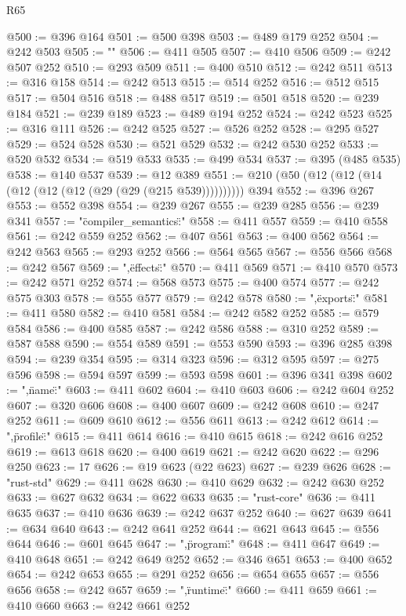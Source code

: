 \begin{lexlean}{R65}
\begin{coremodule}
@500 := @396 @164
@501 := @500 @398
@503 := @489 @179 @252
@504 := @242 @503
@505 := "\n"
@506 := @411 @505
@507 := @410 @506
@509 := @242 @507 @252
@510 := @293 @509
@511 := @400 @510
@512 := @242 @511
@513 := @316 @158
@514 := @242 @513
@515 := @514 @252
@516 := @512 @515
@517 := @504 @516
@518 := @488 @517
@519 := @501 @518
@520 := @239 @184
@521 := @239 @189
@523 := @489 @194 @252
@524 := @242 @523
@525 := @316 @111
@526 := @242 @525
@527 := @526 @252
@528 := @295 @527
@529 := @524 @528
@530 := @521 @529
@532 := @242 @530 @252
@533 := @520 @532
@534 := @519 @533
@535 := @499 @534
@537 := @395 (@485 @535)
@538 := @140 @537
@539 := @12 @389
@551 := @210 (@50 (@12 (@12 (@14 (@12 (@12 (@12 (@29 (@29 (@215 @539)))))))))) @394
@552 := @396 @267
@553 := @552 @398
@554 := @239 @267
@555 := @239 @285
@556 := @239 @341
@557 := "{\"compiler_semantics\":"
@558 := @411 @557
@559 := @410 @558
@561 := @242 @559 @252
@562 := @407 @561
@563 := @400 @562
@564 := @242 @563
@565 := @293 @252
@566 := @564 @565
@567 := @556 @566
@568 := @242 @567
@569 := ",\"effects\":"
@570 := @411 @569
@571 := @410 @570
@573 := @242 @571 @252
@574 := @568 @573
@575 := @400 @574
@577 := @242 @575 @303
@578 := @555 @577
@579 := @242 @578
@580 := ",\"exports\":"
@581 := @411 @580
@582 := @410 @581
@584 := @242 @582 @252
@585 := @579 @584
@586 := @400 @585
@587 := @242 @586
@588 := @310 @252
@589 := @587 @588
@590 := @554 @589
@591 := @553 @590
@593 := @396 @285 @398
@594 := @239 @354
@595 := @314 @323
@596 := @312 @595
@597 := @275 @596
@598 := @594 @597
@599 := @593 @598
@601 := @396 @341 @398
@602 := ",\"name\":"
@603 := @411 @602
@604 := @410 @603
@606 := @242 @604 @252
@607 := @320 @606
@608 := @400 @607
@609 := @242 @608
@610 := @247 @252
@611 := @609 @610
@612 := @556 @611
@613 := @242 @612
@614 := ",\"profile\":"
@615 := @411 @614
@616 := @410 @615
@618 := @242 @616 @252
@619 := @613 @618
@620 := @400 @619
@621 := @242 @620
@622 := @296 @250
@623 := 17
@626 := @19 @623 (@22 @623)
@627 := @239 @626
@628 := "rust-std"
@629 := @411 @628
@630 := @410 @629
@632 := @242 @630 @252
@633 := @627 @632
@634 := @622 @633
@635 := "rust-core"
@636 := @411 @635
@637 := @410 @636
@639 := @242 @637 @252
@640 := @627 @639
@641 := @634 @640
@643 := @242 @641 @252
@644 := @621 @643
@645 := @556 @644
@646 := @601 @645
@647 := ",\"program\":"
@648 := @411 @647
@649 := @410 @648
@651 := @242 @649 @252
@652 := @346 @651
@653 := @400 @652
@654 := @242 @653
@655 := @291 @252
@656 := @654 @655
@657 := @556 @656
@658 := @242 @657
@659 := ",\"runtime\":"
@660 := @411 @659
@661 := @410 @660
@663 := @242 @661 @252
}
\end{coremodule}
\end{lexlean}
